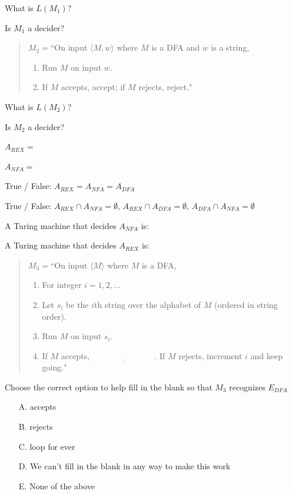 \documentclass[12pt, oneside]{article}
\begin{document}
What is $L(M_1)$? 

\vfill

Is $M_1$ a decider?

\vfill

  
  \begin{quote}
  $M_2 =  $``On  input  $\langle M, w \rangle$ where $M$ is a  DFA and  $w$ is  a string, 
  \begin{enumerate}
  \item Run $M$ on  input  $w$.
  \item If $M$  accepts, accept; if $M$ rejects, reject."
  \end{enumerate}
  \end{quote}
  

  What is $L(M_2)$? 

  \vfill
  
  Is $M_2$ a decider?
  
  \vfill
  
    
\newpage
  $A_{REX} = $

  $A_{NFA} = $


  True / False: $A_{REX} = A_{NFA} = A_{DFA}$

  True / False: $A_{REX} \cap A_{NFA} = \emptyset$, $A_{REX} \cap A_{DFA} = \emptyset$, $A_{DFA} \cap A_{NFA} = \emptyset$

  
  A Turing machine that  decides $A_{NFA}$ is: 
  
  \vfill
  
  A Turing machine that  decides $A_{REX}$ is: 
  
  \vfill
  \newpage
  
  \begin{quote}
  $M_3 =  $``On  input  $\langle M\rangle$ where $M$ is a  DFA,
  \begin{enumerate}
  \item For integer  $i = 1, 2, \ldots$
  \item \qquad Let  $s_i$ be the  $i$th string over  the alphabet of  $M$ (ordered in  string order).
  \item \qquad Run $M$ on  input  $s_i$.
  \item \qquad If $M$  accepts,  $\underline{\phantom{FILL  IN BLANK}}$.  If $M$  rejects, increment $i$ and keep going."
  \end{enumerate}
  \end{quote}
  

Choose the correct option to help fill in the blank so that $M_3$ recognizes $E_{DFA}$
\begin{itemize}
\item[A.] accepts
\item[B.] rejects
\item[C.] loop for ever
\item[D.] We can't fill in the blank in any way to make this work
\item[E.] None of the above
\end{itemize}
\end{document}
